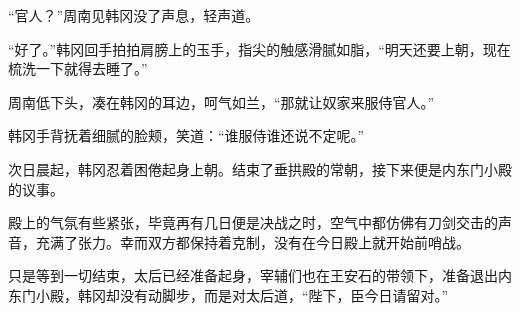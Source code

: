“官人？”周南见韩冈没了声息，轻声道。

“好了。”韩冈回手拍拍肩膀上的玉手，指尖的触感滑腻如脂，“明天还要上朝，现在梳洗一下就得去睡了。”

周南低下头，凑在韩冈的耳边，呵气如兰，“那就让奴家来服侍官人。”

韩冈手背抚着细腻的脸颊，笑道：“谁服侍谁还说不定呢。”

次日晨起，韩冈忍着困倦起身上朝。结束了垂拱殿的常朝，接下来便是内东门小殿的议事。

殿上的气氛有些紧张，毕竟再有几日便是决战之时，空气中都仿佛有刀剑交击的声音，充满了张力。幸而双方都保持着克制，没有在今日殿上就开始前哨战。

只是等到一切结束，太后已经准备起身，宰辅们也在王安石的带领下，准备退出内东门小殿，韩冈却没有动脚步，而是对太后道，“陛下，臣今日请留对。”
